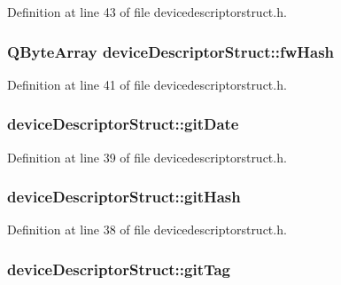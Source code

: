 Definition at line 43 of file devicedescriptorstruct.\-h.

\hypertarget{group___u_a_v_object_util_plugin_ga95764afe0cb2f53538af8c885eed80aa}{
\subsubsection[{fw\-Hash}]{\setlength{\rightskip}{0pt plus 5cm}Q\-Byte\-Array device\-Descriptor\-Struct\-::fw\-Hash}}\label{group___u_a_v_object_util_plugin_ga95764afe0cb2f53538af8c885eed80aa}


Definition at line 41 of file devicedescriptorstruct.\-h.

\hypertarget{group___u_a_v_object_util_plugin_gaf7688dd9b2d5fe676da57bbca33e460d}{
\subsubsection[{git\-Date}]{ device\-Descriptor\-Struct\-::git\-Date}}\label{group___u_a_v_object_util_plugin_gaf7688dd9b2d5fe676da57bbca33e460d}


Definition at line 39 of file devicedescriptorstruct.\-h.

\hypertarget{group___u_a_v_object_util_plugin_ga7c265729bc1bc959e63a3c8f0f1543e8}{
\subsubsection[{git\-Hash}]{ device\-Descriptor\-Struct\-::git\-Hash}}\label{group___u_a_v_object_util_plugin_ga7c265729bc1bc959e63a3c8f0f1543e8}


Definition at line 38 of file devicedescriptorstruct.\-h.

\hypertarget{group___u_a_v_object_util_plugin_ga69f44ea76d04a61aac18e4393eba4e84}{
\subsubsection[{git\-Tag}]{ device\-Descriptor\-Struct\-::git\-Tag}}\label{group___u_a_v_object_util_plugin_ga69f44ea76d04a61aac18e4393eba4e84}


